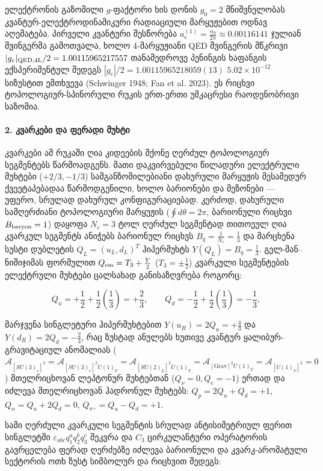 \documentclass[11pt,a4paper]{article}
\begin{document}
ელექტრონის გაზომილი $g$-ფაქტორი ხის დონის $g_0 = 2$ მნიშვნელობას კვანტურ-ელექტროდინამიკური რადიაციული მარყუჟებით ოდნავ აღემატება. პირველი კვანტური შესწორება $a_e^{(1)} = \frac{\alpha_0}{2\pi} \approx 0.00116141$ ჯულიან შვინგერმა გამოთვალა, ხოლო 4-მარყუჟიანი QED შვინგერის მწკრივი $|g_e|_{\rm QED,4L}/2 = 1.00115965217557$ თანამედროვე პენინგის ხაფანგის ექსპერიმენტულ შედეგს $|g_e|/2 = 1.00115965218059(13)$ $5.02\times 10^{-12}$ სიზუსტით ემთხვევა (Schwinger 1948; Fan et al. 2023). ეს რიცხვი ტოპოლოგიურ-სპინორული რუკის ერთ-ერთი უმკაცრესი რაოდენობრივი საზომია.

\paragraph{2. კვარკები და ფერადი მუხტი}

კვარკები ამ რუკაში ღია კიდეების მქონე ღერძულ ტოპოლოგიურ სეგმენტებს წარმოადგენს. მათი დაკვირვებული წილადური ელექტრული მუხტები ($+2/3, -1/3$) სამგანზომილებიანი დახურული მარყუჟის მესამედურ ქვეეტაპებადაა წარმოდგენილი, ხოლო ბარიონები და მეზონები — უფერო, სრულად დახურულ კონფიგურაციებად. კერძოდ, დახურული სამღერძიანი ტოპოლოგიური მარყუჟის ($\oint d\theta = 2\pi$, ბარიონული რიცხვი $B_{\rm baryon} = 1$) დაყოფა $N_c = 3$ ტოლ ღერძულ სეგმენტად თითოეულ ღია კვარკულ სეგმენტს ანიჭებს ბარიონულ რიცხვს $B_q = \frac{1}{N_c} = \frac{1}{3}$ და მარცხენა სუსტი დუბლეტის $Q_L = (u_L, d_L)^T$ ჰიპერმუხტს $Y(Q_L) = B_q = \frac{1}{3}$. გელ-მან–ნიშიჯიმას ფორმულით $Q_{\rm em} = T_3 + \frac{Y}{2}$ ($T_3 = \pm\frac{1}{2}$) კვარკული სეგმენტების ელექტრული მუხტები ცალსახად განისაზღვრება როგორც:

\[
Q_u = +\frac{1}{2} + \frac{1}{2}\left(\frac{1}{3}\right) = +\frac{2}{3}, \qquad Q_d = -\frac{1}{2} + \frac{1}{2}\left(\frac{1}{3}\right) = -\frac{1}{3},
\]

მარჯვენა სინგლეტური ჰიპერმუხტებით $Y(u_R) = 2 Q_u = +\frac{4}{3}$ და $Y(d_R) = 2 Q_d = -\frac{2}{3}$, რაც ზუსტად ანულებს ხუთივე კვანტურ ყალიბურ-გრავიტაციულ ანომალიას ($\mathcal{A}_{[SU(3)_c]^3} = \mathcal{A}_{[SU(3)_c]^2 U(1)_Y} = \mathcal{A}_{[SU(2)_L]^2 U(1)_Y} = \mathcal{A}_{[\mathrm{Grav}]^2 U(1)_Y} = \mathcal{A}_{[U(1)_Y]^3} = 0$) მთელრიცხოვან ლეპტონურ მუხტებთან ($Q_\nu = 0, Q_e = -1$) ერთად და იძლევა მთელრიცხოვან ჰადრონულ მუხტებს: $Q_p = 2 Q_u + Q_d = +1$, $Q_n = Q_u + 2 Q_d = 0$, $Q_{\pi^+} = Q_u - Q_d = +1$.

სამი ღერძული კვარკული სეგმენტის სრულად ანტისიმეტრიულ ფერით სინგლეტში $\varepsilon_{abc}q_1^a q_2^b q_3^c$ შეკვრა და $C_3$ ცირკულანტური ოპერატორის გავრცელება ფერად ღერძებზე იძლევა ბარიონული და კვარკ-არომატული სექტორის ოთხ ზუსტ სიმბოლურ და რიცხვით შედეგს:
\end{document}
